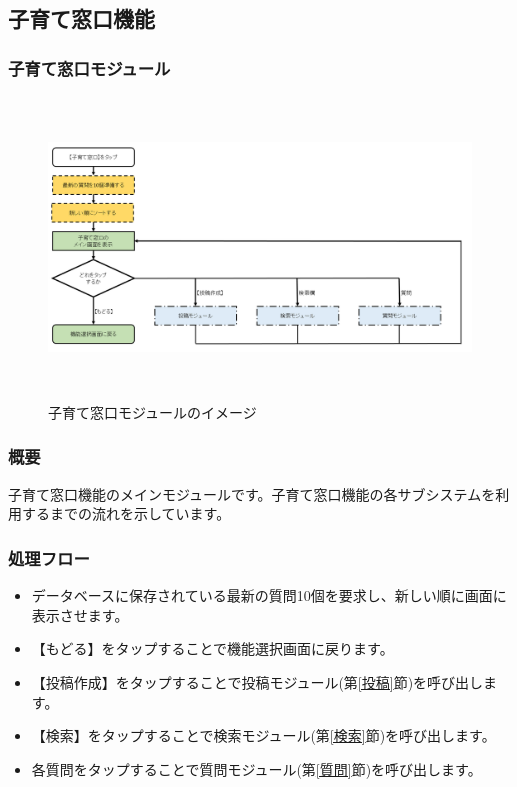 \documentclass[a4j]{jarticle}
\begin{document}
\subsection{子育て窓口機能}
\subsubsection{子育て窓口モジュール\label{子育て窓口}} %
\begin{figure}[H]
    \begin{center}
      \includegraphics[height=8.0cm] {子育て窓口_全体.png} %
    \caption {子育て窓口モジュールのイメージ}
    \label{functionselection}
    \end{center}
\end{figure}
\subsubsection*{概要}
子育て窓口機能のメインモジュールです。子育て窓口機能の各サブシステムを利用するまでの流れを示しています。
\subsubsection*{処理フロー}
\begin{itemize}
\item データベースに保存されている最新の質問10個を要求し、新しい順に画面に表示させます。
\item 【もどる】をタップすることで機能選択画面に戻ります。
\item 【投稿作成】をタップすることで投稿モジュール(第\ref{投稿}節)を呼び出します。
\item 【検索】をタップすることで検索モジュール(第\ref{検索}節)を呼び出します。
\item 各質問をタップすることで質問モジュール(第\ref{質問}節)を呼び出します。

\end{itemize}
\end{document}

